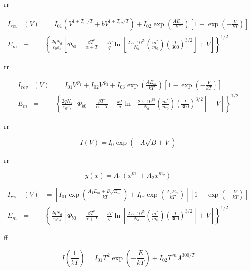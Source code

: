 \documentclass[14pt]{article}
\numberwithin{equation}{part}
\begin{document}
rr


\begin{eqnarray*}
    I_{rev}&(V)&=I_{01}\left(V^{1+T_{01}/T}+bV^{1+T_{02}/T}\right)+I_{02}\exp\left(\frac{AE_m}{kT}\right)\left[1-\exp\left(-\frac{V}{kT}\right)\right] \\
    E_m&=&\left\{\frac{2qN_d}{\varepsilon_0\varepsilon_s}\left[\Phi_{b0}-\frac{\beta T^2}{\alpha+T}-\frac{kT}{q}\ln\left[\frac{2.5\cdot10^{25}}{N_d}\left(\frac{m^*}{m_0}\right)
     \left(\frac{T}{300}\right)^{3/2}\right]+V\right]\right\}^{1/2}
\end{eqnarray*}


rr


\begin{eqnarray*}
    I_{rev}&(V)&=I_{01}V^{\,p_1}+I_{02}V^{\,p_2}+I_{03}\exp\left(\frac{AE_m}{kT}\right)\left[1-\exp\left(-\frac{V}{kT}\right)\right] \\
    E_m&=&\left\{\frac{2qN_d}{\varepsilon_0\varepsilon_s}\left[\Phi_{b0}-\frac{\beta T^2}{\alpha+T}-\frac{kT}{q}\ln\left[\frac{2.5\cdot10^{25}}{N_d}\left(\frac{m^*}{m_0}\right)
     \left(\frac{T}{300}\right)^{3/2}\right]+V\right]\right\}^{1/2}
\end{eqnarray*}


rr


\begin{equation*}
    I(V)=I_0\exp\left(-A\sqrt{B+V}\right)
\end{equation*}

rr


\begin{equation*}
    y(x)=A_1\left(x^{m_1}+A_2x^{m_2}\right)
\end{equation*}

\begin{eqnarray*}
    I_{rev}&(V)&=\left[I_{01}\exp\left(\frac{A_1E_m+B\sqrt{E_m}}{kT}\right)+I_{02}\exp\left(\frac{A_2E_m}{kT}\right)\right]
    \left[1-\exp\left(-\frac{V}{kT}\right)\right] \\
    E_m&=&\left\{\frac{2qN_d}{\varepsilon_0\varepsilon_s}\left[\Phi_{b0}-\frac{\beta T^2}{\alpha+T}-\frac{kT}{q}\ln\left[\frac{2.5\cdot10^{25}}{N_d}\left(\frac{m^*}{m_0}\right)
     \left(\frac{T}{300}\right)^{3/2}\right]+V\right]\right\}^{1/2}
\end{eqnarray*}

ff

\begin{equation*}
    I\left(\frac{1}{kT}\right)=I_{01}T^{\,2}\exp\left(-\frac{E}{kT}\right)+
       I_{02}T^{\,m}A^{300/T}
\end{equation*}
\end{document}
